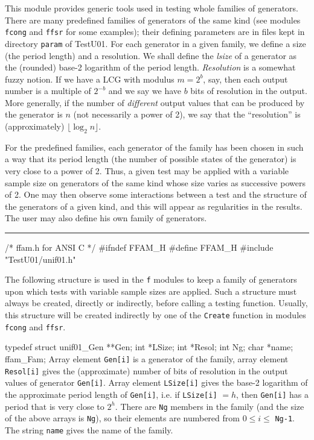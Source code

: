 
This module provides generic tools used in testing whole families of
generators. There are many predefined families of generators of the same
kind (see modules {\tt fcong} and {\tt ffsr} for some examples);
 their defining parameters are in files kept in directory {\tt param}
of TestU01. For each generator in a given family, we define a
size (the period length) and a resolution. We shall define
the {\it lsize} of a generator as the (rounded) base-2 logarithm of the 
period length. \emph{Resolution} is a somewhat fuzzy notion.
If we have a LCG with modulus $m = 2^b$, say, then each output number
is a multiple of $2^{-b}$ and we say we have $b$ bits of resolution
in the output.  
More generally, if the number of \emph{different} output values 
that can be produced
by the generator is $n$ (not necessarily a power of 2), we say that
the ``resolution'' is (approximately) $\lfloor\log_2 n\rfloor$.


For the predefined families, each generator of the family has been chosen 
in such a way that its period length (the number of possible states of the
generator) is very close to a power of 2. Thus, a given test may be applied
with a variable sample size on generators of the same kind whose size
varies as successive powers of 2. One may then observe some interactions
between a test and the structure of the generators of a given kind, and this
will appear as regularities in the results.
The user may also define his own family of generators.

\bigskip
\hrule
\code\hide
/* ffam.h  for ANSI C */
#ifndef FFAM_H
#define FFAM_H
\endhide
#include "TestU01/unif01.h"
\endcode



The following structure is used in the {\tt f} modules
to keep a family of generators upon which tests with variable sample
sizes are applied. Such a structure must always be created, directly or
indirectly, before calling a testing function. Usually, this structure will
be created indirectly by one of the {\tt Create} function in modules
{\tt fcong} and {\tt ffsr}.
 
\code


typedef struct {
   unif01_Gen **Gen;
   int *LSize;
   int *Resol;
   int Ng;
   char *name;
} ffam_Fam;
\endcode
\tab  Array element {\tt Gen[i]} is a generator of
  the family, array element {\tt Resol[i]} gives the (approximate) number
  of bits of resolution in the output values of generator {\tt Gen[i]}.
  Array element {\tt LSize[i]} gives the base-2 logarithm of the approximate
  period length of {\tt Gen[i]}, i.e. if {\tt LSize[i]} $= h$, then
  {\tt Gen[i]} has a period that is very close to $2^h$. There are {\tt Ng}
  members in the family (and the size of the above arrays is 
  {\tt Ng}), so their elements are numbered from $0 \le i \le$ {\tt Ng-1}.
  The string {\tt name} gives the name of the family.
\endtab
\code


